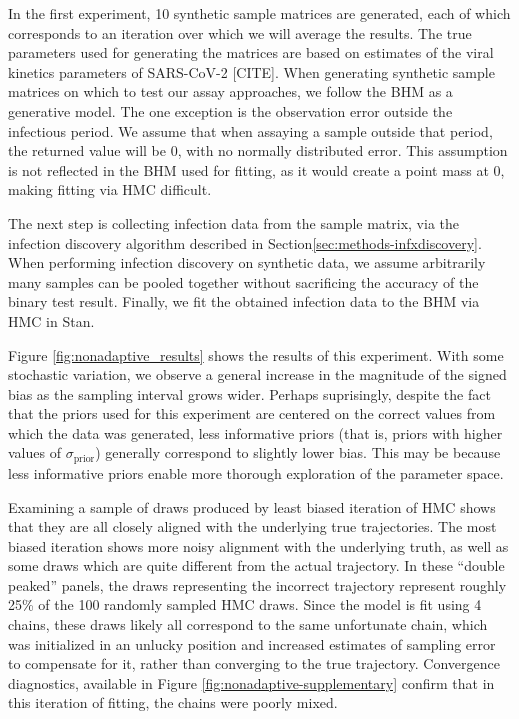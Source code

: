 \documentclass[11pt,notitlepage]{article}
\begin{document}
In the first experiment, 10 synthetic sample matrices are generated, each of which corresponds to an iteration over which we will average the results. 
The true parameters used for generating the matrices are based on estimates of the viral kinetics parameters of SARS-CoV-2 [CITE].
When generating synthetic sample matrices on which to test our assay approaches, we follow the BHM as a generative model.
The one exception is the observation error outside the infectious period.
We assume that when assaying a sample outside that period, the returned value will be 0, with no normally distributed error.
This assumption is not reflected in the BHM used for fitting, as it would create a point mass at 0, making fitting via HMC difficult.

The next step is collecting infection data from the sample matrix, via the infection discovery algorithm described in Section\ref{sec:methods-infxdiscovery}.
When performing infection discovery on synthetic data, we assume arbitrarily many samples can be pooled together without sacrificing the accuracy of the binary test result.
Finally, we fit the obtained infection data to the BHM via HMC in Stan. 

Figure \ref{fig:nonadaptive_results} shows the results of this experiment.
With some stochastic variation, we observe a general increase in the magnitude of the signed bias as the sampling interval grows wider.
Perhaps suprisingly, despite the fact that the priors used for this experiment are centered on the correct values from which the data was generated, less informative priors (that is, priors with higher values of $\sigma_{\text{prior}}$) generally correspond to slightly lower bias.
This may be because less informative priors enable more thorough exploration of the parameter space.

Examining a sample of draws produced by least biased iteration of HMC shows that they are all closely aligned with the underlying true trajectories.
The most biased iteration shows more noisy alignment with the underlying truth, as well as some draws which are quite different from the actual trajectory.
In these ``double peaked'' panels, the draws representing the incorrect trajectory represent roughly 25\% of the 100 randomly sampled HMC draws.
Since the model is fit using 4 chains, these draws likely all correspond to the same unfortunate chain, which was initialized in an unlucky position and increased estimates of sampling error to compensate for it, rather than converging to the true trajectory.
Convergence diagnostics, available in Figure \ref{fig:nonadaptive-supplementary} confirm that in this iteration of fitting, the chains were poorly mixed.
\end{document}
